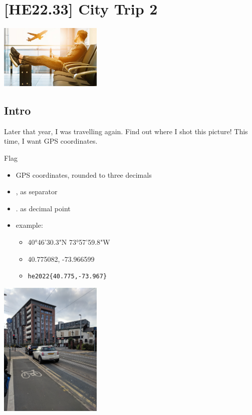 
\hypertarget{he22.33}{%
\chapter{[HE22.33] City Trip 2}\label{he22.33}}

\begin{marginfigure}
	\includegraphics[width=49mm]{level7/challenge33.jpg}
\end{marginfigure}
\section{Intro}
Later that year, I was travelling again. Find out where I shot this picture!
This time, I want GPS coordinates.

 Flag
\begin{itemize}
\item GPS coordinates, rounded to three decimals
\item  , as separator
\item  . as decimal point
\item  example:
\begin{itemize}
\item  40°46'30.3"N 73°57'59.8"W
\item  40.775082, -73.966599
\item  \verb+he2022{40.775,-73.967}+
\end{itemize}	
\end{itemize}	

\begin{marginfigure}
	\includegraphics[width=49mm]{level7/citytrip2.jpg}
\end{marginfigure}



